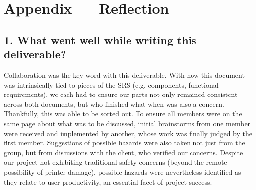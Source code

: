 \documentclass{article}
\begin{document}
\iffalse
\wss{Which safety requirements will be implemented as part of the capstone timeline?
Which requirements will be implemented in the future?}
\fi


\newpage{}

\section*{Appendix --- Reflection}

\iffalse
\wss{Not required for CAS 741}
\fi



\subsection*{1. What went well while writing this deliverable?} 
Collaboration was the key word with this deliverable. With how this document was intrinsically tied 
to pieces of the SRS (e.g. components, functional requirements), we each had to ensure our parts not only 
remained consistent across both documents, but who finished what when was also a concern. Thankfully, 
this was able to be sorted out. To ensure all members were on the same page about what was to be discussed, 
initial brainstorms from one member were received and implemented by another, whose work was finally 
judged by the first member. Suggestions of possible hazards were also taken not just from the group, but 
from discussions with the client, who verified our concerns. Despite our project not exhibiting traditional 
safety concerns (beyond the remote possibility of printer damage), possible hazards were nevertheless 
identified as they relate to user productivity, an essential facet of project success.
\end{document}
